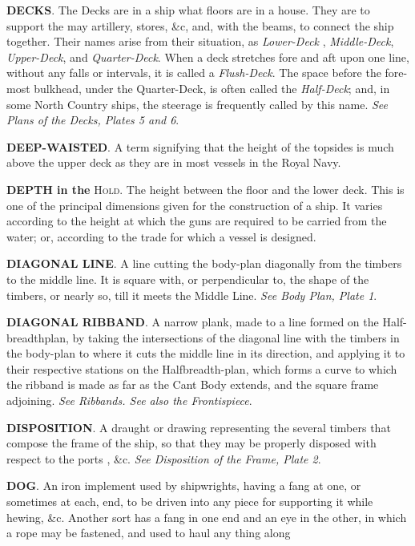 \textbf{DECKS}. The Decks are in a ship what floors are in a house. They are to support the may artillery, stores, \&c, and, with the beams, to connect the ship together. Their names arise from their situation, as \textit{Lower-Deck} , \textit{Middle-Deck}, \textit{Upper-Deck}, and \textit{Quarter-Deck}. When a deck stretches fore and aft upon one line, without any falls or intervals, it is called a \textit{Flush-Deck}. The space before the fore-most bulkhead, under the Quarter-Deck, is often called the\textit{ Half-Deck}; and, in some North Country ships, the steerage is frequently called by this name. \textit{See Plans of the Decks, Plates 5 and 6}. 

\textbf{DEEP-WAISTED}. A term signifying that the height of the topsides is much above the upper deck as they are in most vessels in the Royal Navy. 

\textbf{DEPTH in the} \textsc{Hold}. The height between the floor and the lower deck. This is one of the principal dimensions given for the construction of a ship. It varies according to the height at which the guns are required to be carried from the water; or, according to the trade for which a vessel is designed. 

\textbf{DIAGONAL LINE}. A line cutting the body-plan diagonally from the timbers to the middle line. It is square with, or perpendicular to, the shape of the timbers, or nearly so, till it meets the Middle Line. \textit{See Body Plan, Plate 1}. 

\textbf{DIAGONAL RIBBAND}. A narrow plank, made to a line formed on the Half-breadthplan, by taking the intersections of the diagonal line with the timbers in the body-plan to where it cuts the middle line in its direction, and applying it to their respective stations on the Halfbreadth-plan, which forms a curve to which the ribband is made as far as the Cant Body extends, and the square frame adjoining.\textit{ See Ribbands. See also the Frontispiece}. 

\textbf{DISPOSITION}. A draught or drawing representing the several timbers that compose the frame of the ship, so that they may be properly disposed with respect to the ports , \&c. \textit{See Disposition of the Frame, Plate 2}. 

\textbf{DOG}. An iron implement used by shipwrights, having a fang at one, or sometimes at each, end, to be driven into any piece for supporting it while hewing, \&c. Another sort has a fang in one end and an eye in the other, in which a rope may be fastened, and used to haul any thing along 

